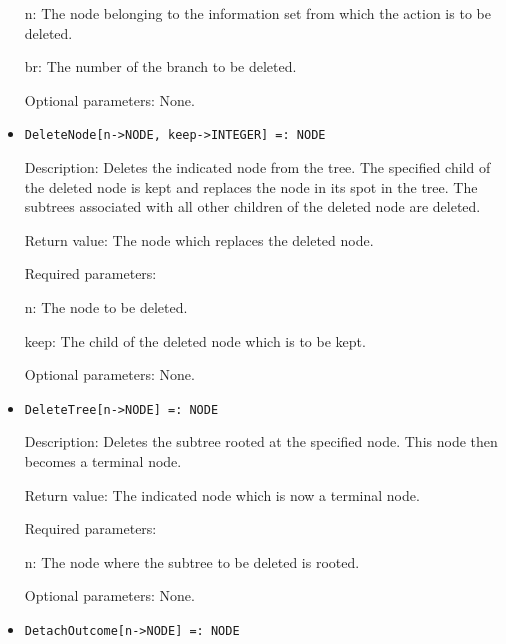 \begin{itemize}
\bd
\item
[n:] The node belonging to the information set from which the action
is to be deleted.
\item [br:] The number of the branch to be deleted.
\ed

\item
[Optional parameters:] None.
\ed

\item
\protect \large \begin{verbatim}
DeleteNode[n->NODE, keep->INTEGER] =: NODE
\end{verbatim}\normalsize

\bd
\item   
[Description:] Deletes the indicated node from the tree.  The
specified child of the deleted node is kept and replaces the node in
its spot in the tree.  The subtrees associated with all other children
of the deleted node are deleted.
\item
[Return value:] The node which replaces the deleted node.
\item
[Required parameters:]\hfil\null
	
\bd
\item
[n:] The node to be deleted.
\item
[keep:] The child of the deleted node which is to be kept.
\ed

\item
[Optional parameters:] None.
\ed

\item
\protect \large \begin{verbatim}
DeleteTree[n->NODE] =: NODE
\end{verbatim}\normalsize

\bd
\item
[Description:] Deletes the subtree rooted at the specified node.  This
node then becomes a terminal node.
\item
[Return value:] The indicated node which is now a terminal node.
\item
[Required parameters:]\hfil\null

\bd
\item  
[n:] The node where the subtree to be deleted is rooted.
\ed

\item
[Optional parameters:] None.
\ed

\item
\protect \large \begin{verbatim}
DetachOutcome[n->NODE] =: NODE
\end{verbatim}\normalsize


\end{itemize}
